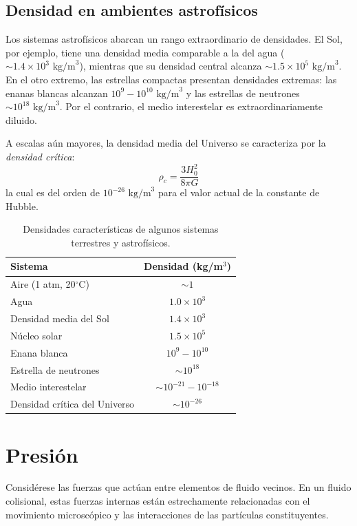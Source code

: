 \subsection{Densidad en ambientes astrofísicos}
Los sistemas astrofísicos abarcan un rango extraordinario de densidades. El Sol, por ejemplo, tiene una densidad media comparable a la del agua ($\sim 1.4 \times 10^3 \text{ kg/m}^3$), mientras que su densidad central alcanza $\sim 1.5 \times 10^5 \text{ kg/m}^3$. En el otro extremo, las estrellas compactas presentan densidades extremas: las enanas blancas alcanzan $10^9 - 10^{10} \text{ kg/m}^3$ y las estrellas de neutrones $\sim 10^{18} \text{ kg/m}^3$. Por el contrario, el medio interestelar es extraordinariamente diluido.

A escalas aún mayores, la densidad media del Universo se caracteriza por la \textit{densidad crítica}:
$$ \rho_c = \frac{3H_0^2}{8\pi G} $$
la cual es del orden de $10^{-26} \text{ kg/m}^3$ para el valor actual de la constante de Hubble.

\begin{table}[htbp]
\centering
\begin{tabular}{l c}
\hline
\textbf{Sistema} & \textbf{Densidad (kg/m$^3$)} \\
\hline
Aire (1 atm, 20$^\circ$C) & $\sim 1$ \\
Agua & $1.0 \times 10^3$ \\
Densidad media del Sol & $1.4 \times 10^3$ \\
Núcleo solar & $1.5 \times 10^5$ \\
Enana blanca & $10^9 - 10^{10}$ \\
Estrella de neutrones & $\sim 10^{18}$ \\
Medio interestelar & $\sim 10^{-21} - 10^{-18}$ \\
Densidad crítica del Universo & $\sim 10^{-26}$ \\
\hline
\end{tabular}
\caption{Densidades características de algunos sistemas terrestres y astrofísicos.}
\end{table}

\section{Presión}

Considérese las fuerzas que actúan entre elementos de fluido vecinos. En un fluido colisional, estas fuerzas internas están estrechamente relacionadas con el movimiento microscópico y las interacciones de las partículas constituyentes.

